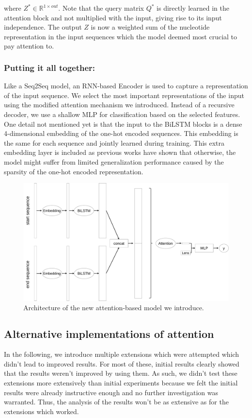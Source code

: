 
where $Z^* \in \mathbb{R}^{1 \times out}$. Note that the query matrix ${Q}^*$ is directly learned in the attention block and not multiplied with the input, giving rise to its input independence. The output $Z$ is now a weighted sum of the nucleotide representation in the input sequences which the model deemed most crucial to pay attention to.
\subsubsection{Putting it all together:} 
Like a Seq2Seq model, an RNN-based Encoder is used to capture a representation of the input sequence. We select the most important representations of the input using the modified attention mechanism we introduced. Instead of a recursive decoder, we use a shallow MLP for classification based on the selected features.
One detail not mentioned yet is that the input to the BiLSTM blocks is a dense 4-dimensional embedding of the one-hot encoded sequences. This embedding is the same for each sequence and jointly learned during training. This extra embedding layer is included as previous works \cite{embeddingneeded} have shown that otherwise, the model might suffer from limited generalization performance caused by the sparsity of the one-hot encoded representation. 

\begin{figure}
	\centering\includegraphics[width=1\textwidth]{figures/AttnBiLSTM.pdf} 
	\caption{Architecture of the new attention-based model we introduce. }
	\label{fig:attnbilstm}
\end{figure}

\subsection{Alternative implementations of attention} \label{subsec:alternative_attention}
In the following, we introduce multiple extensions which were attempted which didn't lead to improved results. For most of these, initial results clearly showed that the results weren't improved by using them. As such, we didn't test these extensions more extensively than initial experiments because we felt the initial results were already instructive enough and no further investigation was warranted. Thus, the analysis of the results won't be as extensive as for the extensions which worked.
